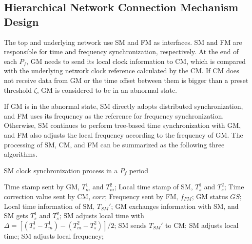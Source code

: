 \documentclass[conference]{IEEEtran}
\begin{document}

\subsection{Hierarchical Network Connection Mechanism Design}\label{CC}
The top and underlying network use SM and FM as interfaces. SM and FM are responsible for time and frequency synchronization, respectively. At the end of each $P_f$, GM needs to send its local clock information to CM, which is compared with the underlying network clock reference calculated by the CM. If CM does not receive data from GM or the time offset between them is bigger than a preset threshold $\zeta$, GM is considered to be in an abnormal state.

If GM is in the abnormal state, SM directly adopts distributed synchronization, and FM uses its frequency as the reference for frequency synchronization. Otherwise, SM continues to perform tree-based time synchronization with GM, and FM also adjusts the local frequency according to the frequency of GM. The processing of SM, CM, and FM can be summarized as the following three algorithms.


\begin{algorithm}[ht]  
	\caption{SM clock synchronization process in a $P_f$ period}  
	\begin{algorithmic}[1]
		\REQUIRE Time stamp sent by GM, $T_m^1$ and $T_m^2$; Local time stamp of SM, $T_s^1$ and $T_s^2$; Time correction value sent by CM, $corr$; Frequency sent by FM, $f_{FM}$; GM status $GS$;
		\ENSURE Local time information of SM, $T_{SM}'$;
					\STATE GM exchanges information with SM, and SM gets $T_s^1$ and $T_s^2$;
						\STATE SM adjusts local time with $\Delta = [(T_s^1 - T_m^1) - (T_m^2 - T_s^2)]/2$;
					\ENDIF
				\ENDIF
				\STATE SM sends $T_{SM}'$ to CM;
					\STATE SM adjusts local time;
				\ENDIF
					\STATE SM adjusts local frequency;
				\ENDIF
			\ENDWHILE
		\ENDWHILE
	\end{algorithmic}
\end{algorithm}
\end{document}
